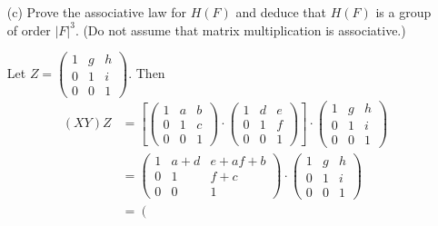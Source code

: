 \documentclass[12pt]{article}
\begin{document}
\begin{enumerate}
\begin{enumerate}
        \item[(c)] Prove the associative law for $H(F)$ and
        deduce that $H(F)$ is a group of order $|F|^3$.
        (Do not assume that matrix multiplication
        is associative.)
        \begin{mybox}
            
            Let $Z=\left(\begin{array}{ccc}
                1 & g & h\\
                0 & 1 & i\\
                0 & 0 & 1 \end{array}
                \right)$.
            Then
            \begin{align*}
                (XY)Z&=
                \left[\left(\begin{array}{ccc}
                    1 & a & b\\
                    0 & 1 & c\\
                    0 & 0 & 1 \end{array}
                \right)\cdot
                \left(\begin{array}{ccc}
                    1 & d & e\\
                    0 & 1 & f\\
                    0 & 0 & 1 \end{array}
                \right)\right]\cdot
                \left(\begin{array}{ccc}
                    1 & g & h\\
                    0 & 1 & i\\
                    0 & 0 & 1 \end{array}
                \right)\\
                &=\left(\begin{array}{ccc}
                    1 & a+d & e+af+b\\
                    0 & 1 & f+c\\
                    0 & 0 & 1 \end{array}
                \right)\cdot
                \left(\begin{array}{ccc}
                        1 & g & h\\
                        0 & 1 & i\\
                        0 & 0 & 1 \end{array}
                \right)\\
                &=\left(\begin{array}{ccc}

\end{array}
\end{align*}
\end{mybox}
\end{enumerate}
\end{enumerate}
\end{document}
